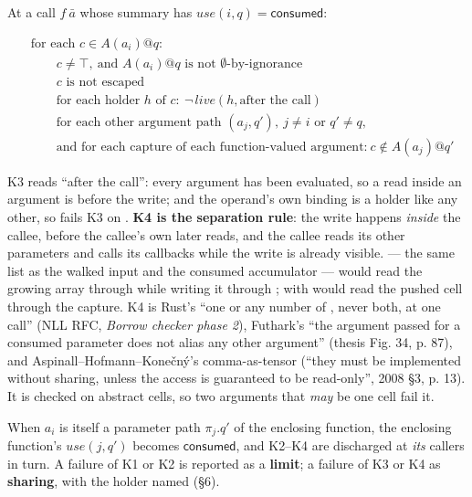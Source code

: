 At a call $f\ \bar{a}$ whose summary has $\mathit{use}(i,\allowbreak{}q)=\mathsf{consumed}$:

\begin{align*}
&\text{for each } c \in A(a_i)@q:\\
&\qquad c \neq \top,\ \text{and } A(a_i)@q \text{ is not } \emptyset\text{-by-ignorance} \tag*{(K1: the cell is known)}\\
&\qquad c \text{ is not escaped} \tag*{(K2: nothing unseen holds it)}\\
&\qquad \text{for each holder } h \text{ of } c:\ \neg\,\mathit{live}(h, \text{after the call}) \tag*{(K3: nothing reads it later)}\\
&\qquad \text{for each other argument path } (a_j, q'),\ j \neq i \text{ or } q' \neq q,\\
&\qquad \text{and for each capture of each function-valued argument:}\ c \notin A(a_j)@q' \tag*{(K4: nothing reads it during)}
\end{align*}

K3 reads “after the call”: every argument has been evaluated, so a read inside an argument is before the write; and the operand's own binding is a holder like any other, so  fails K3 on . \textbf{K4 is the separation rule}: the write happens \emph{inside} the callee, before the callee's own later reads, and the callee reads its other parameters and calls its callbacks while the write is already visible.  — the same list as the walked input and the consumed accumulator — would read the growing array through  while writing it through ;  with  would read the pushed cell through the capture. K4 is Rust's “one  or any number of \code{\&}, never both, at one call” (NLL RFC, \emph{Borrow checker phase 2}), Futhark's “the argument passed for a consumed parameter does not alias any other argument” (thesis Fig. 34, p. 87), and Aspinall–Hofmann–Konečný's comma-as-tensor (“they must be implemented without sharing, unless the access is guaranteed to be read-only”, 2008 §3, p. 13). It is checked on abstract cells, so two arguments that \emph{may} be one cell fail it.

When $a_{i}$ is itself a parameter path $\pi _{j}.q'$ of the enclosing function, the enclosing function's $\mathit{use}(j,\allowbreak{}q')$ becomes $\mathsf{consumed}$, and K2–K4 are discharged at \emph{its} callers in turn. A failure of K1 or K2 is reported as a \textbf{limit}; a failure of K3 or K4 as \textbf{sharing}, with the holder named (§6).

